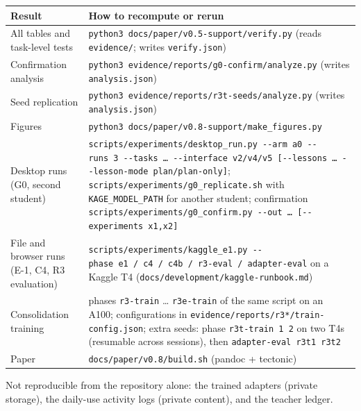 \documentclass[
  10pt,
]{article}
\newcounter{none} %
\begin{document}
{\def\LTcaptype{none} %
\begin{longtable}[]{@{}
  >{\raggedright\arraybackslash}p{}
  >{\raggedright\arraybackslash}p{}@{}}
\toprule\noalign{}
\begin{minipage}[b]{\linewidth}\raggedright
Result
\end{minipage} & \begin{minipage}[b]{\linewidth}\raggedright
How to recompute or rerun
\end{minipage} \\
\midrule\noalign{}
\endhead
\bottomrule\noalign{}
\endlastfoot
All tables and task-level tests &
\texttt{python3\ docs/paper/v0.5-support/verify.py} (reads
\texttt{evidence/}; writes \texttt{verify.json}) \\
Confirmation analysis &
\texttt{python3\ evidence/reports/g0-confirm/analyze.py} (writes
\texttt{analysis.json}) \\
Seed replication &
\texttt{python3\ evidence/reports/r3t-seeds/analyze.py} (writes
\texttt{analysis.json}) \\
Figures & \texttt{python3\ docs/paper/v0.8-support/make\_figures.py} \\
Desktop runs (G0, second student) &
\texttt{scripts/experiments/desktop\_run.py\ -\/-arm\ a0\ -\/-runs\ 3\ -\/-tasks\ \ldots{}\ -\/-interface\ v2/v4/v5\ {[}-\/-lessons\ \ldots{}\ -\/-lesson-mode\ plan/plan-only{]}};
\texttt{scripts/experiments/g0\_replicate.sh} with
\texttt{KAGE\_MODEL\_PATH} for another student; confirmation
\texttt{scripts/experiments/g0\_confirm.py\ -\/-out\ \ldots{}\ {[}-\/-experiments\ x1,x2{]}} \\
File and browser runs (E-1, C4, R3 evaluation) &
\texttt{scripts/experiments/kaggle\_e1.py\ -\/-phase\ e1\ /\ c4\ /\ c4b\ /\ r3-eval\ /\ adapter-eval}
on a Kaggle T4 (\texttt{docs/development/kaggle-runbook.md}) \\
Consolidation training & phases \texttt{r3-train} \ldots{}
\texttt{r3e-train} of the same script on an A100; configurations in
\texttt{evidence/reports/r3*/train-config.json}; extra seeds: phase
\texttt{r3t-train\ 1\ 2} on two T4s (resumable across sessions), then
\texttt{adapter-eval\ r3t1\ r3t2} \\
Paper & \texttt{docs/paper/v0.8/build.sh} (pandoc + tectonic) \\
\end{longtable}
}

Not reproducible from the repository alone: the trained adapters
(private storage), the daily-use activity logs (private content), and
the teacher ledger.
\end{document}
